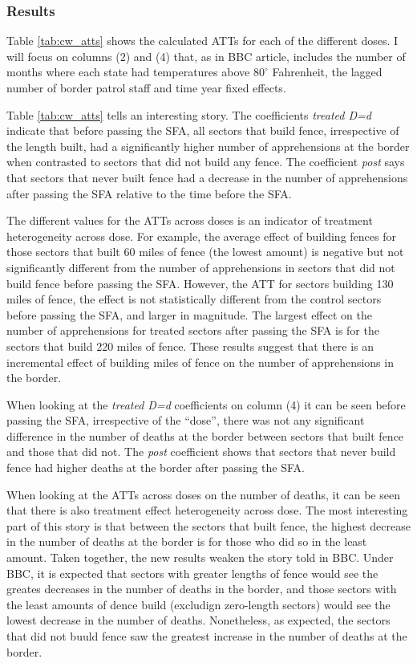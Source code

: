 \documentclass[titlepage]{article}
\theoremstyle{plain}
\theoremstyle{plain}
\begin{document}
\subsubsection*{Results}

Table \ref{tab:cw_atts} shows the calculated ATTs for each of the different doses. I will focus on columns (2) and (4) that, as in BBC article, includes the number of months where each state had temperatures above $80^{\circ}$ Fahrenheit, the lagged number of border patrol staff and time year fixed effects.



Table \ref{tab:cw_atts} tells an interesting story. The coefficients \textit{treated D=d} indicate that before passing the SFA, all sectors that build fence, irrespective of the length built, had a significantly higher number of apprehensions at the border when contrasted to sectors that did not build any fence. The coefficient \textit{post} says that sectors that never built fence had a decrease in the number of apprehensions after passing the SFA relative to the time before the SFA.

The different values for the ATTs across doses is an indicator of treatment heterogeneity across dose. For example, the average effect of building fences for those sectors that built 60 miles of fence (the lowest amount) is negative but not significantly different from the number of apprehensions in sectors that did not build fence before passing the SFA. However, the ATT for sectors building 130 miles of fence, the effect is not statistically different from the control sectors before passing the SFA, and larger in magnitude. The largest effect on the number of apprehensions for treated sectors after passing the SFA is for the sectors that build 220 miles of fence. These results suggest that there is an incremental effect of building miles of fence on the number of apprehensions in the border.

When looking at the \textit{treated D=d} coefficients on column (4) it can be seen before passing the SFA, irrespective of the \enquote{dose}, there was not any significant difference in the number of deaths at the border between sectors that built fence and those that did not. The \textit{post} coefficient shows that sectors that never build fence had higher deaths at the border after passing the SFA.

When looking at the ATTs across doses on the number of deaths, it can be seen that there is also treatment effect heterogeneity across dose. The most interesting part of this story is that between the sectors that built fence, the highest decrease in the number of deaths at the border is for those who did so in the least amount. Taken together, the new results weaken the story told in BBC. Under BBC, it is expected that sectors with greater lengths of fence would see the greates decreases in the number of deaths in the border, and those sectors with the least amounts of dence build (excludign zero-length sectors) would see the lowest decrease in the number of deaths. Nonetheless, as expected, the sectors that did not buuld fence saw the greatest increase in the number of deaths at the border.
\end{document}
